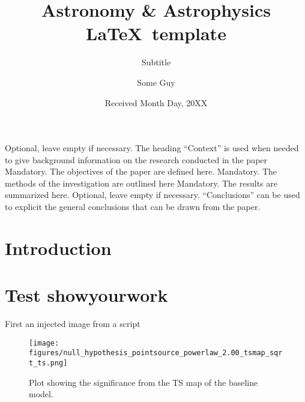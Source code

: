 \documentclass{aa}
\begin{document}
\title{Astronomy \& Astrophysics \LaTeX\ template}

\subtitle{Subtitle}

\author{Some Guy}


\date{Received Month Day, 20XX}


   \abstract
   {Optional, leave empty if necessary.  The heading “Context” is used when needed to
give background information on the research conducted in the paper}
   {Mandatory. The objectives of the paper are defined here.} 
   {Mandatory. The methods of the investigation are outlined here}
   {Mandatory. The results are summarized here.}
   {Optional, leave empty if necessary.  “Conclusions” can be used to
explicit the general conclusions that can be drawn from the paper.}


   \maketitle


\section{Introduction}
\lipsum[1]


\section{Test showyourwork}

First an injected image from a script

\begin{figure}[h!]
   \begin{centering}
       \texttt{[image: figures/null\_hypothesis\_pointsource\_powerlaw\_2.00\_tsmap\_sqrt\_ts.png]}
       \caption{
           Plot showing the significance from the TS map of the baseline model.
       }
       \label{fig:baseline_sqrt_ts}
   \end{centering}
\end{figure}
\end{document}
